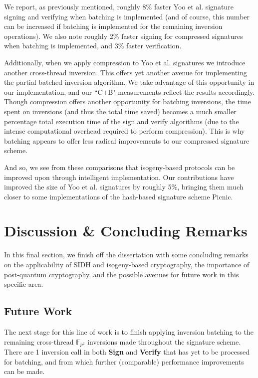 We report, as previously mentioned, roughly 8\% faster Yoo et al. signature signing and verifying when batching is implemented (and of course, this number can be increased if batching is implemented for the remaining inversion operations). We also note roughly 2\% faster signing for compressed signatures when batching is implemented, and 3\% faster verification.

Additionally, when we apply compression to Yoo et al. signatures we introduce another cross-thread inversion. This offers yet another avenue for implementing the partial batched inversion algorithm. We take advantage of this opportunity in our implementation, and our ``C+B" measurements reflect the results accordingly. Though compression offers another opportunity for batching inversions, the time spent on inversions (and thus the total time saved) becomes a much smaller percentage total execution time of the sign and verify algorithms (due to the intense computational overhead required to perform compression). This is why batching appears to offer less radical improvements to our compressed signature scheme. 

\vspace{15px}

And so, we see from these comparisons that isogeny-based protocols can be improved upon through intelligent implementation. Our contributions have improved the size of Yoo et al. signatures by roughly 5\%, bringing them much closer to some implementations of the hash-based signature scheme Picnic.


\section{Discussion \& Concluding Remarks}

In this final section, we finish off the dissertation with some concluding remarks on the applicability of SIDH and isogeny-based cryptography, the importance of post-quantum cryptography, and the possible avenues for future work in this specific area.

\subsection{Future Work}
\label{sec:morebatch}

The next stage for this line of work is to finish applying inversion batching to the remaining cross-thread $\mathbb{F}_{p^2}$ inversions made throughout the signature scheme. There are 1 inversion call in both \textbf{Sign} and \textbf{Verify} that has yet to be processed for batching, and from which further (comparable) performance improvements can be made.

